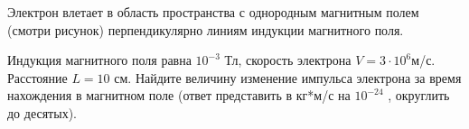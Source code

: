 
Электрон влетает в область пространства с однородным магнитным полем (смотри рисунок) перпендикулярно линиям индукции магнитного поля.


Индукция магнитного поля равна $ 10^{-3} $ Тл, скорость электрона $ V=3\cdot10^6 $м/с. 
Расстояние $ L =10 $ см. Найдите величину изменение импульса электрона за время нахождения в магнитном поле (ответ представить в кг*м/с на $10^{-24}$ , округлить до десятых).

